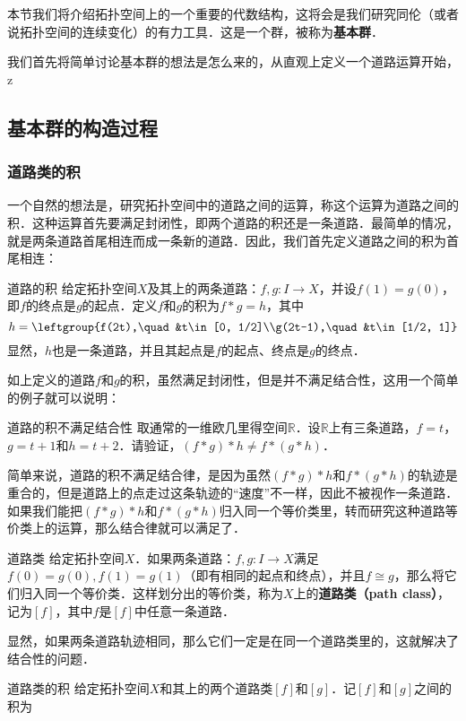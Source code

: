 
本节我们将介绍拓扑空间上的一个重要的代数结构，这将会是我们研究同伦（或者说拓扑空间的连续变化）的有力工具．这是一个群，被称为\textbf{基本群}．

我们首先将简单讨论基本群的想法是怎么来的，从直观上定义一个道路运算开始，z

\subsection{基本群的构造过程}
\subsubsection{道路类的积}

一个自然的想法是，研究拓扑空间中的道路之间的运算，称这个运算为道路之间的积．这种运算首先要满足封闭性，即两个道路的积还是一条道路．最简单的情况，就是两条道路首尾相连而成一条新的道路．因此，我们首先定义道路之间的积为首尾相连：

\begin{definition}{道路的积}
给定拓扑空间$X$及其上的两条道路：$f, g:I\rightarrow X$，并设$f(1)=g(0)$，即$f$的终点是$g$的起点．定义$f$和$g$的积为$f*g=h$，其中\begin{equation}h=\leftgroup{f(2t),\quad &t\in[0, 1/2]\\g(2t-1),\quad &t\in[1/2, 1]}\end{equation}
显然，$h$也是一条道路，并且其起点是$f$的起点、终点是$g$的终点．
\end{definition}

如上定义的道路$f$和$g$的积，虽然满足封闭性，但是并不满足结合性，这用一个简单的例子就可以说明：

\begin{exercise}{道路的积不满足结合性}
取通常的一维欧几里得空间$\mathbb{R}$．设$\mathbb{R}$上有三条道路，$f=t$，$g=t+1$和$h=t+2$．请验证，$(f*g)*h\not=f*(g*h)$．
\end{exercise}

简单来说，道路的积不满足结合律，是因为虽然$(f*g)*h$和$f*(g*h)$的轨迹是重合的，但是道路上的点走过这条轨迹的“速度”不一样，因此不被视作一条道路．如果我们能把$(f*g)*h$和$f*(g*h)$归入同一个等价类里，转而研究这种道路等价类上的运算，那么结合律就可以满足了．

\begin{definition}{道路类}
给定拓扑空间$X$．如果两条道路：$f, g:I\rightarrow X$满足$f(0)=g(0), f(1)=g(1)$（即有相同的起点和终点），并且$f\cong g$，那么将它们归入同一个等价类．这样划分出的等价类，称为$X$上的\textbf{道路类（path class）}，记为$[f]$，其中$f$是$[f]$中任意一条道路．
\end{definition}

显然，如果两条道路轨迹相同，那么它们一定是在同一个道路类里的，这就解决了结合性的问题．

\begin{definition}{道路类的积}
给定拓扑空间$X$和其上的两个道路类$[f]$和$[g]$．记$[f]$和$[g]$之间的积为
\end{definition}







